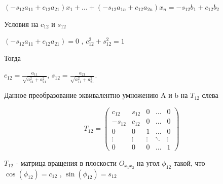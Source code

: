 \begin{math}
	(-s_{12}a_{11}+c_{12}a_{21})x_{1}+...+(-s_{12}a_{1n}+c_{12}a_{2n})x_{n}=-s_{12}b_{1}+c_{12}b_{2}
\end{math}

Условия на 
\begin{math}
	c_{12}
\end{math} и
\begin{math}
	s_{12}
\end{math}  

\begin{math}
	(-s_{12}a_{11}+c_{12}a_{21})=0 
\end{math}
,
\begin{math}
	c_{12}^{2}+s_{12}^{2}=1
\end{math}
 
 Тогда
 
 \begin{math}
 	c_{12}=\frac{a_{11}}{\sqrt{a_{11}^{2}+a_{21}^{2}}}
 \end{math},
\begin{math}
	s_{12}=\frac{a_{21}}{\sqrt{a_{11}^{2}+a_{21}^{2}}}
\end{math}.

Данное преобразование эквивалентно умножению A и b на 
\begin{math}
	T_{12}
\end{math} слева

\begin{equation*}
	T_{12} = \left(
	\begin{array}{ccccc}
		c_{12} & s_{12} & 0 & \ldots & 0\\
		-s_{12} & c_{12} & 0 & \ldots & 0\\
		0 & 0 & 1 & \ldots & 0\\
		\vdots & \vdots & \vdots & \ddots & \vdots\\
		0 & 0 & 0 & \ldots & 1
	\end{array}
	\right)
\end{equation*}


\begin{math}
	T_{12}
\end{math} 
- матрица вращения в плоскости 
\begin{math}
	O_{x_{1}x_{2}}
\end{math}
на угол 
\begin{math}
	\phi_{12}
\end{math} 
такой, что 
\begin{math}
	\cos (\phi_{12}) = c_{12}
\end{math} ,
\begin{math}
	\sin (\phi_{12}) = s_{12}
\end{math} 
 
